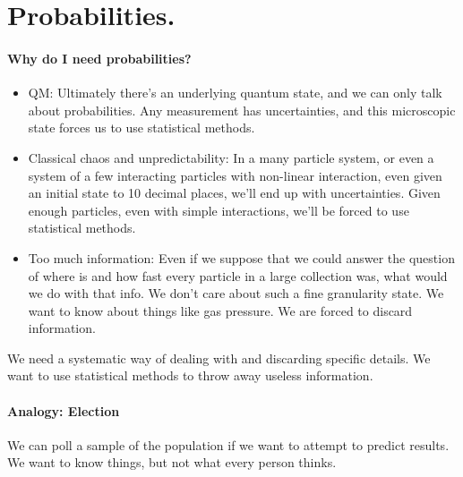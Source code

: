 %
%
\section{Probabilities.}
%
\paragraph{Why do I need probabilities?}
%
\begin{itemize}
\item QM: Ultimately there's an underlying quantum state, and we can only talk about probabilities.  Any measurement has uncertainties, and this microscopic state forces us to use statistical methods.
\item Classical chaos and unpredictability: In a many particle system, or even a system of a few interacting particles with non-linear interaction, even given an initial state to 10 decimal places, we'll end up with uncertainties.  Given enough particles, even with simple interactions, we'll be forced to use statistical methods.
\item Too much information: Even if we suppose that we could answer the question of where is and how fast every particle in a large collection was, what would we do with that info.  We don't care about such a fine granularity state.  We want to know about things like gas pressure.  We are forced to discard information.
\end{itemize}

We need a systematic way of dealing with and discarding specific details.  We want to use statistical methods to throw away useless information.
%
\paragraph{Analogy: Election}
%
We can poll a sample of the population if we want to attempt to predict results.  We want to know things, but not what every person thinks.

